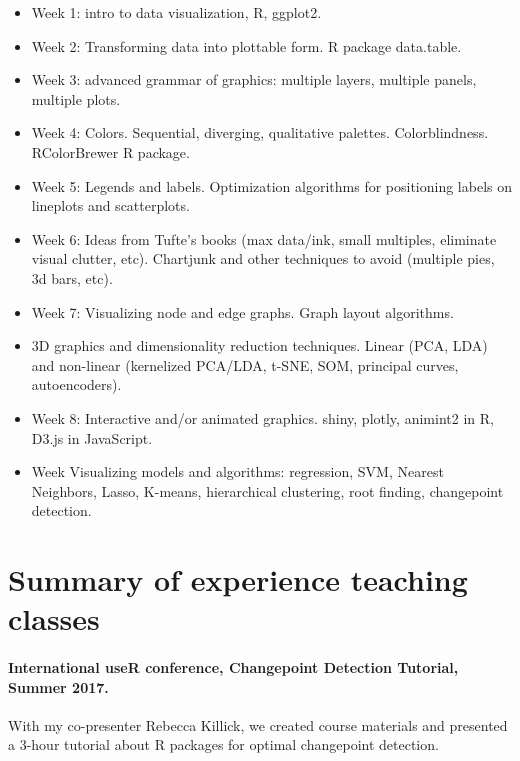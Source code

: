\documentclass{article}
\begin{document}
\begin{itemize}
\item Week 1: intro to data visualization, R, ggplot2.
\item Week 2: Transforming data into plottable form. R package
  data.table.
\item Week 3: advanced grammar of graphics: multiple layers, multiple
  panels, multiple plots.
\item Week 4: Colors. Sequential, diverging, qualitative palettes.
  Colorblindness. RColorBrewer R package.
\item Week 5: Legends and labels. Optimization algorithms for positioning
  labels on lineplots and scatterplots.
\item Week 6: Ideas from Tufte's books (max data/ink, small multiples,
  eliminate visual clutter, etc). Chartjunk and other techniques to
  avoid (multiple pies, 3d bars, etc).
\item Week 7: Visualizing node and edge graphs. Graph layout algorithms.
\item 3D graphics and dimensionality reduction techniques. Linear
  (PCA, LDA) and non-linear (kernelized PCA/LDA, t-SNE, SOM, principal
  curves, autoencoders).
\item Week 8: Interactive and/or animated graphics. shiny, plotly, animint2 in R,
  D3.js in JavaScript.
\item Week Visualizing models and algorithms: regression, SVM, Nearest
  Neighbors, Lasso, K-means, hierarchical clustering, root finding,
  changepoint detection.
\end{itemize}

\section{Summary of experience teaching classes} 


\paragraph{International useR conference, Changepoint Detection
  Tutorial, Summer 2017.} With my co-presenter Rebecca Killick, we
created course materials and presented a 3-hour tutorial about R
packages for optimal changepoint detection. 
\end{document}
